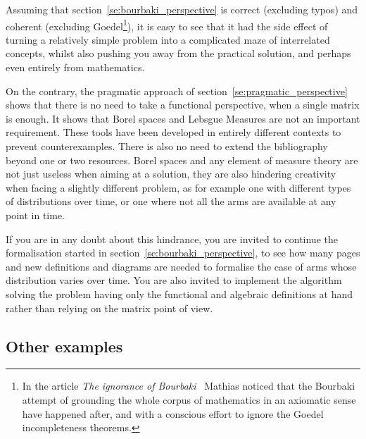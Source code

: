 \documentclass[]{scrartcl}
\theoremstyle{definition}
\begin{document}
Assuming that section~\ref{se:bourbaki_perspective} is correct (excluding typos) and coherent (excluding Goedel\footnote{
    In the article \emph{The ignorance of Bourbaki}~\cite{mathias1992ignorance} Mathias noticed that the Bourbaki attempt of grounding the whole corpus of mathematics in an axiomatic sense have happened after, and with a conscious effort to ignore the Goedel incompleteness theorems.
}), it is easy to see that it had the side effect of turning a relatively simple problem into a complicated maze of interrelated concepts, whilst also pushing you away from the practical solution, and perhaps even entirely from mathematics.

On the contrary, the pragmatic approach of section~\ref{se:pragmatic_perspective} shows that there is no need to take a functional perspective, when a single matrix is enough. It shows that Borel spaces and Lebsgue Measures are not an important requirement. These tools have been developed in entirely different contexts to prevent counterexamples. There is also no need to extend the bibliography beyond one or two resources. Borel spaces and any element of measure theory are not just useless when aiming at a solution, they are also hindering creativity when facing a slightly different problem, as for example one with different types of distributions over time, or one where not all the arms are available at any point in time.

If you are in any doubt about this hindrance, you are invited to continue the formalisation started in section~\ref{se:bourbaki_perspective}, to see how many pages and new definitions and diagrams are needed to formalise the case of arms whose distribution varies over time. You are also invited to implement the algorithm solving the problem having only the functional and algebraic definitions at hand rather than relying on the matrix point of view.



\subsection*{Other examples}
\end{document}
